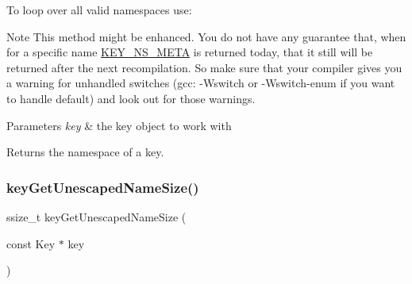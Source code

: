  To loop over all valid namespaces use\+: 
 \begin{DoxyNote}{Note}
This method might be enhanced. You do not have any guarantee that, when for a specific name \hyperlink{group__key_ggaec3b8d6f430ae49b91bafe8a86310a68ac5fbf2c3a7ae79fa2d60c48ae3e72688}{K\+E\+Y\+\_\+\+N\+S\+\_\+\+M\+E\+TA} is returned today, that it still will be returned after the next recompilation. So make sure that your compiler gives you a warning for unhandled switches (gcc\+: -\/\+Wswitch or -\/\+Wswitch-\/enum if you want to handle default) and look out for those warnings.
\end{DoxyNote}

\begin{DoxyParams}{Parameters}
{\em key} & the key object to work with \\
\hline
\end{DoxyParams}
\begin{DoxyReturn}{Returns}
the namespace of a key. 
\end{DoxyReturn}
\mbox{\label{group__keyname_ga5e7eff0c77678420199d0d2e8729152b}} 
\subsubsection{\texorpdfstring{key\+Get\+Unescaped\+Name\+Size()}{keyGetUnescapedNameSize()}}
{\footnotesize\ttfamily ssize\+\_\+t key\+Get\+Unescaped\+Name\+Size (\begin{DoxyParamCaption}\item[{const Key $\ast$}]{key }\end{DoxyParamCaption})}



